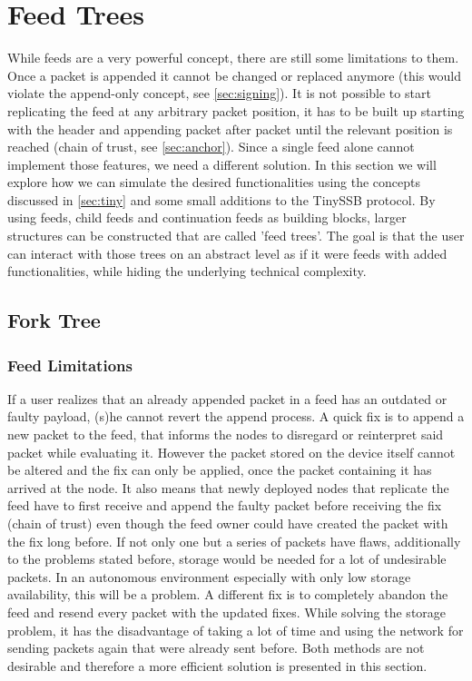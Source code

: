 \chapter{Feed Trees}

While feeds are a very powerful concept, there are still some limitations to them. Once a packet is appended it cannot be changed or replaced anymore (this would violate the append-only concept, see \cref{sec:signing}). It is not possible to start replicating the feed at any arbitrary packet position, it has to be built up starting with the header and appending packet after packet until the relevant position is reached (chain of trust, see \cref{sec:anchor}). Since a single feed alone cannot implement those features, we need a different solution. In this section we will explore how we can simulate the desired functionalities using the concepts discussed in \cref{sec:tiny} and some small additions to the TinySSB protocol. By using feeds, child feeds and continuation feeds as building blocks, larger structures can be constructed that are called 'feed trees'. The goal is that the user can interact with those trees on an abstract level as if it were feeds with added functionalities, while hiding the underlying technical complexity.

\section{Fork Tree}
\label{sec:fork}
\subsection{Feed Limitations}
If a user realizes that an already appended packet in a feed has an outdated or faulty payload, (s)he cannot revert the append process. A quick fix is to append a new packet to the feed, that informs the nodes to disregard or reinterpret said packet while evaluating it. However the packet stored on the device itself cannot be altered and the fix can only be applied, once the packet containing it has arrived at the node. It also means that newly deployed nodes that replicate the feed have to first receive and append the faulty packet before receiving the fix (chain of trust) even though the feed owner could have created the packet with the fix long before. If not only one but a series of packets have flaws, additionally to the problems stated before, storage would be needed for a lot of undesirable packets. In an autonomous environment especially with only low storage availability, this will be a problem. A different fix is to completely abandon the feed and resend every packet with the updated fixes. While solving the storage problem, it has the disadvantage of taking a lot of time and using the network for sending packets again that were already sent before. Both methods are not desirable and therefore a more efficient solution is presented in this section. 


